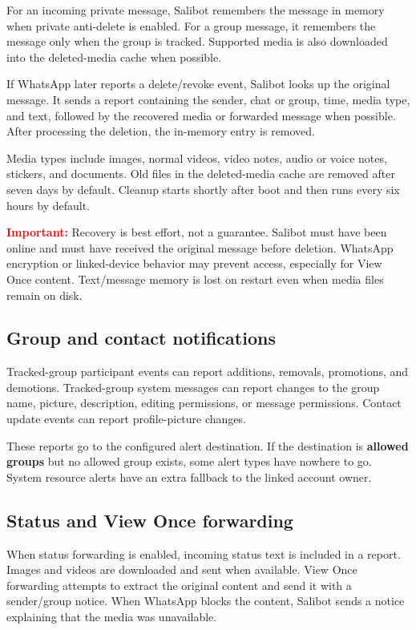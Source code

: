 \documentclass[11pt,a4paper]{article}
\newcommand{\warning}[1]{\textcolor{red}{\textbf{Important:}} #1}
\begin{document}
For an incoming private message, Salibot remembers the message in memory when private anti-delete is enabled. For a group message, it remembers the message only when the group is tracked. Supported media is also downloaded into the deleted-media cache when possible.

If WhatsApp later reports a delete/revoke event, Salibot looks up the original message. It sends a report containing the sender, chat or group, time, media type, and text, followed by the recovered media or forwarded message when possible. After processing the deletion, the in-memory entry is removed.

Media types include images, normal videos, video notes, audio or voice notes, stickers, and documents. Old files in the deleted-media cache are removed after seven days by default. Cleanup starts shortly after boot and then runs every six hours by default.

\warning{Recovery is best effort, not a guarantee. Salibot must have been online and must have received the original message before deletion. WhatsApp encryption or linked-device behavior may prevent access, especially for View Once content. Text/message memory is lost on restart even when media files remain on disk.}

\subsection{Group and contact notifications}

Tracked-group participant events can report additions, removals, promotions, and demotions. Tracked-group system messages can report changes to the group name, picture, description, editing permissions, or message permissions. Contact update events can report profile-picture changes.

These reports go to the configured alert destination. If the destination is \textbf{allowed groups} but no allowed group exists, some alert types have nowhere to go. System resource alerts have an extra fallback to the linked account owner.

\subsection{Status and View Once forwarding}

When status forwarding is enabled, incoming status text is included in a report. Images and videos are downloaded and sent when available. View Once forwarding attempts to extract the original content and send it with a sender/group notice. When WhatsApp blocks the content, Salibot sends a notice explaining that the media was unavailable.
\end{document}
